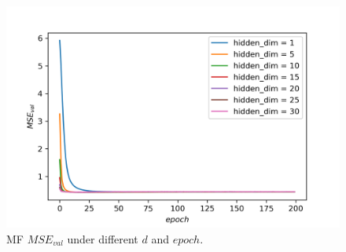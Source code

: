 \documentclass[journal, a4paper]{IEEEtran}
\begin{document}
\begin{figure}[!hbt]
	\begin{center}
		\includegraphics[width=\columnwidth]{h_val_losses}
		\caption{MF $MSE_{val}$ under different $d$ and $epoch$. }
		\label{fig:h_val_losses}
	\end{center}
\end{figure} \par
\end{document}
